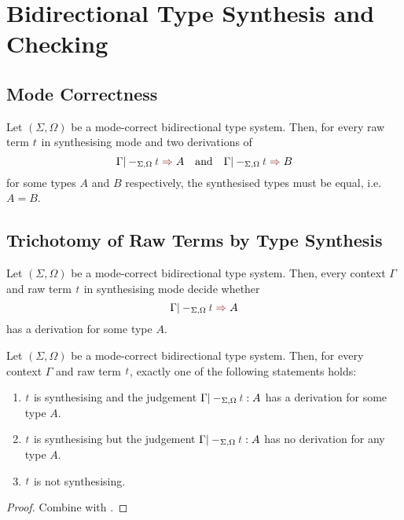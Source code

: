 
\section{Bidirectional Type Synthesis and Checking} \label{sec:type-synthesis}

\subsection{Mode Correctness} \label{sec:mode-correctness}
\begin{definition} \label{def:mode-correctness}
\end{definition}


\begin{theorem}\label{thm:unique-syn}
  Let $(\Sigma, \Omega)$ be a mode-correct bidirectional type system.
  Then, for every raw term $\isTerm{t}$ in synthesising mode and two derivations of 
  \[
    \Gamma |-_{\Sigma, \Omega} \isTerm{t} \syn A
    \quad\text{and}\quad
    \Gamma |-_{\Sigma, \Omega} \isTerm{t} \syn B
  \]
  for some types $A$ and $B$ respectively, the synthesised types must be equal, i.e.\ $A = B$.
\end{theorem}
 

\subsection{Trichotomy of Raw Terms by Type Synthesis}

\begin{theorem} \label{thm:bidirectional-type-synthesis}
  Let $(\Sigma, \Omega)$ be a mode-correct bidirectional type system.
  Then, every context $\Gamma$ and raw term $\isTerm{t}$ in synthesising mode decide whether
  \[
    \Gamma |-_{\Sigma, \Omega} \isTerm{t} \syn A
  \]
  has a derivation for some type $A$.
\end{theorem}

\begin{corollary}\label{cor:trichotomy}
  Let $(\Sigma, \Omega)$ be a mode-correct bidirectional type system.
  Then, for every context $\Gamma$ and raw term $\isTerm{t}$, exactly one of the following statements holds:
  \begin{enumerate}
    \item $\isTerm{t}$ is synthesising and the judgement $\Gamma |-_{\Sigma, \Omega} \isTerm{t} : A$ has a derivation for some type $A$.
    \item $\isTerm{t}$ is synthesising but the judgement $\Gamma |-_{\Sigma, \Omega} \isTerm{t} : A$ has no derivation for any type $A$.
    \item $\isTerm{t}$ is not synthesising.
  \end{enumerate}
\end{corollary}
\begin{proof}
  Combine   with .
  
\end{proof}

